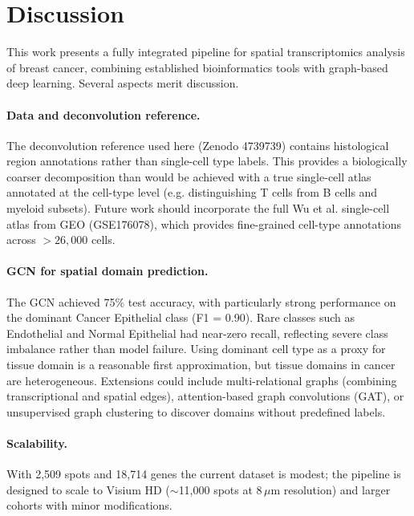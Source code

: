 \documentclass[12pt, a4paper]{article}
\begin{document}
\section{Discussion}

This work presents a fully integrated pipeline for spatial transcriptomics analysis of breast cancer, combining established bioinformatics tools with graph-based deep learning. Several aspects merit discussion.

\paragraph{Data and deconvolution reference.} The deconvolution reference used here (Zenodo 4739739) contains histological region annotations rather than single-cell type labels. This provides a biologically coarser decomposition than would be achieved with a true single-cell atlas annotated at the cell-type level (e.g. distinguishing T cells from B cells and myeloid subsets). Future work should incorporate the full Wu et al. \citeyearpar{wu2021} single-cell atlas from GEO (GSE176078), which provides fine-grained cell-type annotations across $>26{,}000$ cells.

\paragraph{GCN for spatial domain prediction.} The GCN achieved 75\% test accuracy, with particularly strong performance on the dominant Cancer Epithelial class (F1 = 0.90). Rare classes such as Endothelial and Normal Epithelial had near-zero recall, reflecting severe class imbalance rather than model failure. Using dominant cell type as a proxy for tissue domain is a reasonable first approximation, but tissue domains in cancer are heterogeneous. Extensions could include multi-relational graphs (combining transcriptional and spatial edges), attention-based graph convolutions (GAT), or unsupervised graph clustering to discover domains without predefined labels.

\paragraph{Scalability.} With 2,509 spots and 18,714 genes the current dataset is modest; the pipeline is designed to scale to Visium HD ($\sim$11,000 spots at 8\,$\mu$m resolution) and larger cohorts with minor modifications.

\end{document}
